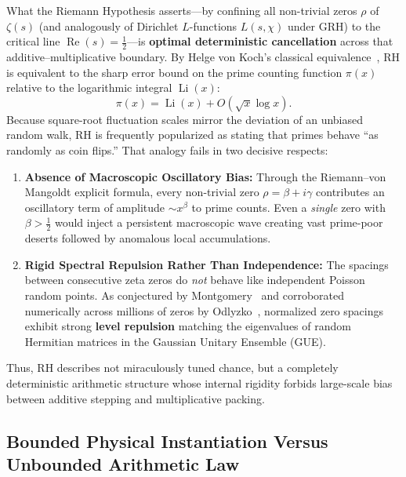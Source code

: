 \documentclass[11pt,a4paper]{article}
\begin{document}
What the Riemann Hypothesis asserts---by confining all non-trivial zeros $\rho$ of $\zeta(s)$ (and analogously of Dirichlet $L$-functions $L(s,\chi)$ under GRH) to the critical line $\operatorname{Re}(s) = \tfrac{1}{2}$---is \textbf{optimal deterministic cancellation} across that additive--multiplicative boundary. By Helge von Koch's classical equivalence~\cite{vonkoch1901}, RH is equivalent to the sharp error bound on the prime counting function $\pi(x)$ relative to the logarithmic integral $\operatorname{Li}(x)$:
\begin{equation}
  \pi(x) = \operatorname{Li}(x) + O\!\left(\sqrt{x}\log x\right).
\end{equation}
Because square-root fluctuation scales mirror the deviation of an unbiased random walk, RH is frequently popularized as stating that primes behave ``as randomly as coin flips.'' That analogy fails in two decisive respects:
\begin{enumerate}
  \item \textbf{Absence of Macroscopic Oscillatory Bias:} Through the Riemann--von Mangoldt explicit formula, every non-trivial zero $\rho = \beta + i\gamma$ contributes an oscillatory term of amplitude $\sim x^{\beta}$ to prime counts. Even a \emph{single} zero with $\beta > \tfrac{1}{2}$ would inject a persistent macroscopic wave creating vast prime-poor deserts followed by anomalous local accumulations.
  \item \textbf{Rigid Spectral Repulsion Rather Than Independence:} The spacings between consecutive zeta zeros do \emph{not} behave like independent Poisson random points. As conjectured by Montgomery~\cite{montgomery1973} and corroborated numerically across millions of zeros by Odlyzko~\cite{odlyzko1987}, normalized zero spacings exhibit strong \textbf{level repulsion} matching the eigenvalues of random Hermitian matrices in the Gaussian Unitary Ensemble (GUE).
\end{enumerate}
Thus, RH describes not miraculously tuned chance, but a completely deterministic arithmetic structure whose internal rigidity forbids large-scale bias between additive stepping and multiplicative packing.

\subsection{Bounded Physical Instantiation Versus Unbounded Arithmetic Law}
\end{document}
